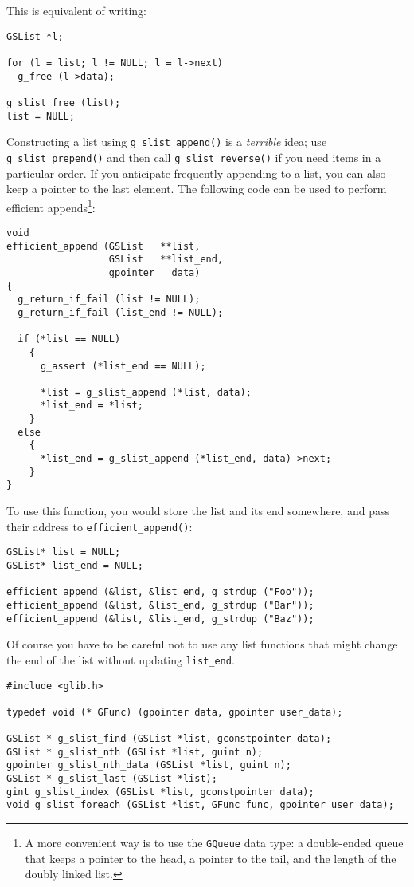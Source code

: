 This is equivalent of writing:
\begin{lstlisting}
GSList *l;

for (l = list; l != NULL; l = l->next)
  g_free (l->data);

g_slist_free (list);
list = NULL;
\end{lstlisting}

Constructing a list using \lstinline{g_slist_append()} is a \emph{terrible} idea; use \lstinline{g_slist_prepend()} and then call \lstinline{g_slist_reverse()} if you need items in a particular order. If you anticipate frequently appending to a list, you can also keep a pointer to the last element. The following code can be used to perform efficient appends\footnote{A more convenient way is to use the \lstinline{GQueue} data type: a double-ended queue that keeps a pointer to the head, a pointer to the tail, and the length of the doubly linked list.}:

\pagebreak[2]
\begin{lstlisting}
void
efficient_append (GSList   **list,
                  GSList   **list_end,
                  gpointer   data)
{
  g_return_if_fail (list != NULL);
  g_return_if_fail (list_end != NULL);

  if (*list == NULL)
    {
      g_assert (*list_end == NULL);

      *list = g_slist_append (*list, data);
      *list_end = *list;
    }
  else
    {
      *list_end = g_slist_append (*list_end, data)->next;
    }
}
\end{lstlisting}

To use this function, you would store the list and its end somewhere, and pass their address to \lstinline{efficient_append()}:
\begin{lstlisting}
GSList* list = NULL;
GSList* list_end = NULL;

efficient_append (&list, &list_end, g_strdup ("Foo"));
efficient_append (&list, &list_end, g_strdup ("Bar"));
efficient_append (&list, &list_end, g_strdup ("Baz"));
\end{lstlisting}

Of course you have to be careful not to use any list functions that might change the end of the list without updating \lstinline{list_end}.

\begin{lstlisting}[float, caption={Accessing data in a linked list}, label=glib-listaccess]
#include <glib.h>

typedef void (* GFunc) (gpointer data, gpointer user_data);

GSList * g_slist_find (GSList *list, gconstpointer data);
GSList * g_slist_nth (GSList *list, guint n);
gpointer g_slist_nth_data (GSList *list, guint n);
GSList * g_slist_last (GSList *list);
gint g_slist_index (GSList *list, gconstpointer data);
void g_slist_foreach (GSList *list, GFunc func, gpointer user_data);
\end{lstlisting}

